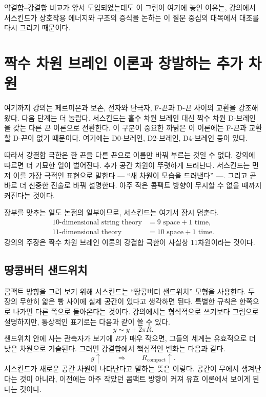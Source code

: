 약결합--강결합 비교가 앞서 도입되었는데도 이 그림이 여기에 놓인 이유는, 강의에서 서스킨드가 상호작용 에너지와 구조의 증식을 논하는 이 질문 중심의 대목에서 대조를 다시 그리기 때문이다.

\section{짝수 차원 브레인 이론과 창발하는 추가 차원}

여기까지 강의는 페르미온과 보손, 전자와 단극자, F-끈과 D-끈 사이의 교환을 강조해 왔다. 다음 단계는 더 놀랍다. 서스킨드는 홀수 차원 브레인 대신 짝수 차원 D-브레인을 갖는 다른 끈 이론으로 전환한다. 이 구분이 중요한 까닭은 이 이론에는 F-끈과 교환할 D-끈이 없기 때문이다. 여기에는 D0-브레인, D2-브레인, D4-브레인 등이 있다.

따라서 강결합 극한은 한 끈을 다른 끈으로 이름만 바꿔 부르는 것일 수 없다. 강의에 따르면 더 기묘한 일이 벌어진다. 추가 공간 차원이 뚜렷하게 드러난다. 서스킨드는 먼저 이를 가장 극적인 표현으로 말한다 --- ``새 차원이 모습을 드러낸다'' ---. 그리고 곧바로 더 신중한 진술로 바꿔 설명한다. 아주 작은 콤팩트 방향이 무시할 수 없을 때까지 커진다는 것이다.

장부를 맞추는 일도 논점의 일부이므로, 서스킨드는 여기서 잠시 멈춘다.
\begin{equation}
\begin{aligned}
10\text{-dimensional string theory} &= 9\text{ space}+1\text{ time},\\
11\text{-dimensional theory} &= 10\text{ space}+1\text{ time}.
\end{aligned}
\end{equation}
강의의 주장은 짝수 차원 브레인 이론의 강결합 극한이 사실상 11차원이라는 것이다.


\subsection{땅콩버터 샌드위치}

콤팩트 방향을 그려 보기 위해 서스킨드는 ``땅콩버터 샌드위치'' 모형을 사용한다. 두 장의 무한히 얇은 빵 사이에 실제 공간이 있다고 생각하면 된다. 특별한 규칙은 한쪽으로 나가면 다른 쪽으로 돌아온다는 것이다. 강의에서는 형식적으로 쓰기보다 그림으로 설명하지만, 통상적인 표기로는 다음과 같이 쓸 수 있다.
\begin{equation}
y \sim y + 2\pi R.
\end{equation}
샌드위치 안에 사는 관측자가 보기에 \(R\)가 매우 작으면, 그들의 세계는 유효적으로 더 낮은 차원으로 기술된다. 그러면 강결합에서 핵심적인 변화는 다음과 같다.
\begin{equation}
g\uparrow
\qquad \Longrightarrow \qquad
R_{\mathrm{compact}}\uparrow.
\end{equation}
서스킨드가 새로운 공간 차원이 나타난다고 말하는 뜻은 이렇다. 공간이 무에서 생겨난다는 것이 아니라, 이전에는 아주 작았던 콤팩트 방향이 커져 유효 이론에서 보이게 된다는 것이다.

